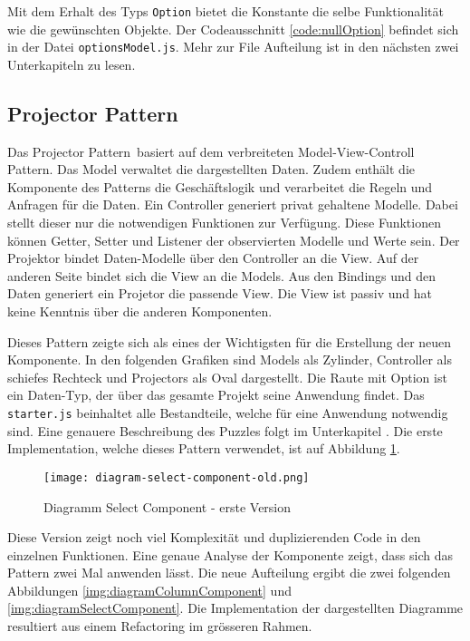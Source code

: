 Mit dem Erhalt des Typs \texttt{Option} bietet die Konstante die selbe Funktionalität wie die gewünschten Objekte. 
Der Codeausschnitt \ref{code:nullOption} befindet sich in der Datei \texttt{optionsModel.js}.
Mehr zur File Aufteilung ist in den nächsten zwei Unterkapiteln zu lesen.

\subsection{Projector Pattern}
\label{sec:projectorPattern}

Das Projector Pattern\footnotemark \ basiert auf dem verbreiteten Model-View-Controll Pattern.
Das Model verwaltet die dargestellten Daten.
Zudem enthält die Komponente des Patterns die Geschäftslogik und verarbeitet die Regeln und Anfragen für die Daten.
Ein Controller generiert privat gehaltene Modelle.
Dabei stellt dieser nur die notwendigen Funktionen zur Verfügung.
Diese Funktionen können Getter, Setter und Listener der observierten Modelle und Werte sein.
Der Projektor bindet Daten-Modelle über den Controller an die View.
Auf der anderen Seite bindet sich die View an die Models.
Aus den Bindings und den Daten generiert ein Projetor die passende View.
Die View ist passiv und hat keine Kenntnis über die anderen Komponenten.

Dieses Pattern zeigte sich als eines der Wichtigsten für die Erstellung der neuen Komponente.
In den folgenden Grafiken sind Models als Zylinder, Controller als schiefes Rechteck und Projectors als Oval dargestellt.
Die Raute mit Option ist ein Daten-Typ, der über das gesamte Projekt seine Anwendung findet.
Das \texttt{starter.js} beinhaltet alle Bestandteile, welche für eine Anwendung notwendig sind.
Eine genauere Beschreibung des Puzzles folgt im Unterkapitel \textbf{}.
Die erste Implementation, welche dieses Pattern verwendet, ist auf Abbildung \ref{img:diagramSelectComponentOld}.

\begin{figure}[!htb]
    \centering
    \texttt{[image: diagram-select-component-old.png]}
    \caption{Diagramm Select Component - erste Version}
    \label{img:diagramSelectComponentOld}
\end{figure}

Diese Version zeigt noch viel Komplexität und duplizierenden Code in den einzelnen Funktionen.
Eine genaue Analyse der Komponente zeigt, dass sich das Pattern zwei Mal anwenden lässt.
Die neue Aufteilung ergibt die zwei folgenden Abbildungen \ref{img:diagramColumnComponent} und \ref{img:diagramSelectComponent}.
Die Implementation der dargestellten Diagramme resultiert aus einem Refactoring im grösseren Rahmen.

